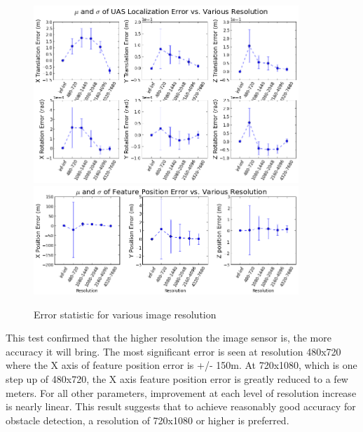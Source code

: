 \begin{figure}[h] 
  \centering
  \includegraphics[width=10cm,keepaspectratio=true]{./Figures/SimulationFigures/Figure50.png}
  \includegraphics[width=10cm,keepaspectratio=true]{./Figures/SimulationFigures/Figure49.png}
  \caption{Error statistic for various image resolution}
  \label{fig:simfig50}
\end{figure}

This test confirmed that the higher resolution the image sensor is, the
more accuracy it will bring. The most significant error is seen at
resolution 480x720 where the X axis of feature position error is +/-
150m. At 720x1080, which is one step up of 480x720, the X axis
feature position error is greatly reduced to a few meters. For all
other parameters, improvement at each level of resolution increase is
nearly linear. This result suggests that to achieve reasonably good
accuracy for obstacle detection, a resolution of 720x1080 or higher is
preferred. 


